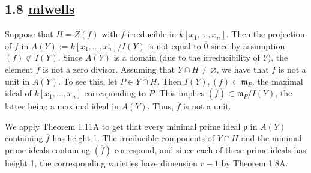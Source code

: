    \subsection*{1.8    \href{https://github.com/mikeleew}{mlwells}
}
    
    Suppose that $H = Z(f)$ with $f$ irreducible in $k[x_1,\ldots, x_n]$.  Then the projection of $f$ in $A(Y) := k[x_1,\ldots,x_n]/I(Y)$ is not equal to $\overline{0}$ since by assumption $(f) \not\subset I(Y)$.  Since $A(Y)$ is a domain (due to the irreducibility of $Y$), the element $\overline{f}$ is not a zero divisor.  Assuming that $Y \cap H \neq \varnothing$, we have that $\overline{f}$ is not a unit in $A(Y)$.  To see this, let $P \in Y \cap H$.  Then $I(Y), (f) \subset \mathfrak{m}_P$, the maximal ideal of $k[x_1,\ldots,x_n]$ corresponding to $P$.  This implies $(\overline{f}) \subset \mathfrak{m}_P / I(Y)$, the latter being a maximal ideal in $A(Y)$.  Thus, $\overline{f}$ is not a unit.

    We apply Theorem 1.11A to get that every minimal prime ideal $\mathfrak{p}$ in $A(Y)$ containing $\overline{f}$ has height 1.  The irreducible components of $Y \cap H$ and the minimal prime ideals containing $(\overline{f})$ correspond, and since each of these prime ideals has height 1, the corresponding varieties have dimension $r-1$ by Theorem 1.8A.
